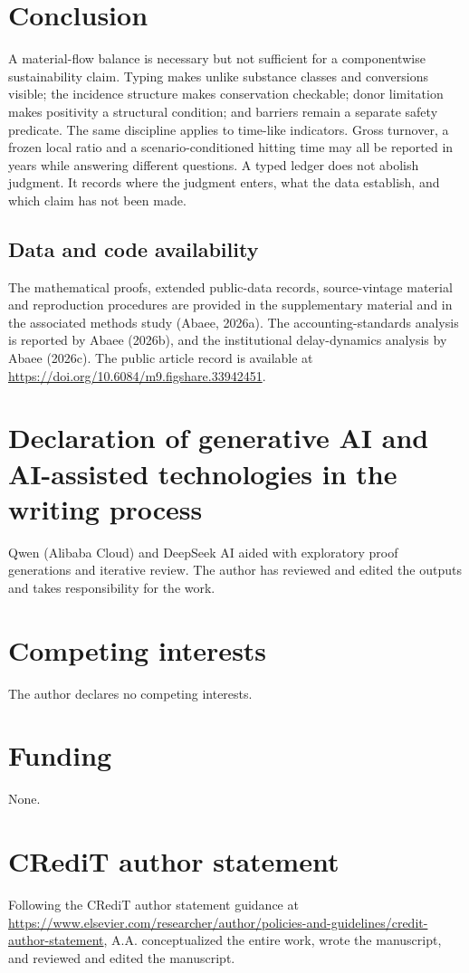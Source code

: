 \documentclass[11pt]{article}
\begin{document}
\section{Conclusion}
A material-flow balance is necessary but not sufficient for a componentwise sustainability claim. Typing makes unlike substance classes and conversions visible; the incidence structure makes conservation checkable; donor limitation makes positivity a structural condition; and barriers remain a separate safety predicate. The same discipline applies to time-like indicators. Gross turnover, a frozen local ratio and a scenario-conditioned hitting time may all be reported in years while answering different questions. A typed ledger does not abolish judgment. It records where the judgment enters, what the data establish, and which claim has not been made.
\subsection*{Data and code availability}
The mathematical proofs, extended public-data records, source-vintage material and reproduction procedures are provided in the supplementary material and in the associated methods study (Abaee, 2026a). The accounting-standards analysis is reported by Abaee (2026b), and the institutional delay-dynamics analysis by Abaee (2026c). The public article record is available at \url{https://doi.org/10.6084/m9.figshare.33942451}.
\section*{Declaration of generative AI and AI-assisted technologies in the writing process}
Qwen (Alibaba Cloud) and DeepSeek AI aided with exploratory proof generations and iterative review. The author has reviewed and edited the outputs and takes responsibility for the work.
\section*{Competing interests}
The author declares no competing interests.
\section*{Funding}
None.
\section*{CRediT author statement}
Following the CRediT author statement guidance at \url{https://www.elsevier.com/researcher/author/policies-and-guidelines/credit-author-statement}, A.A. conceptualized the entire work, wrote the manuscript, and reviewed and edited the manuscript.
\end{document}
